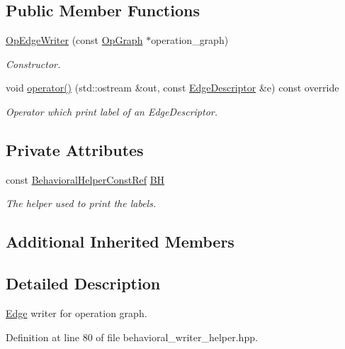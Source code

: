 \subsection*{Public Member Functions}
\begin{DoxyCompactItemize}
\item 
\hyperlink{classOpEdgeWriter_a22bdd4d332a41fc9be24ef3952c322d1}{Op\+Edge\+Writer} (const \hyperlink{structOpGraph}{Op\+Graph} $\ast$operation\+\_\+graph)
\begin{DoxyCompactList}\small\item\em Constructor. \end{DoxyCompactList}\item 
void \hyperlink{classOpEdgeWriter_af4383267715e988b7eaa5468ad6023fb}{operator()} (std\+::ostream \&out, const \hyperlink{graph_8hpp_a9eb9afea34e09f484b21f2efd263dd48}{Edge\+Descriptor} \&e) const override
\begin{DoxyCompactList}\small\item\em Operator which print label of an Edge\+Descriptor. \end{DoxyCompactList}\end{DoxyCompactItemize}
\subsection*{Private Attributes}
\begin{DoxyCompactItemize}
\item 
const \hyperlink{behavioral__helper_8hpp_aae973b54cac87eef3b27442aa3e1e425}{Behavioral\+Helper\+Const\+Ref} \hyperlink{classOpEdgeWriter_a8713fbf90eb090855599df506347c930}{BH}
\begin{DoxyCompactList}\small\item\em The helper used to print the labels. \end{DoxyCompactList}\end{DoxyCompactItemize}
\subsection*{Additional Inherited Members}


\subsection{Detailed Description}
\hyperlink{structEdge}{Edge} writer for operation graph. 

Definition at line 80 of file behavioral\+\_\+writer\+\_\+helper.\+hpp.



